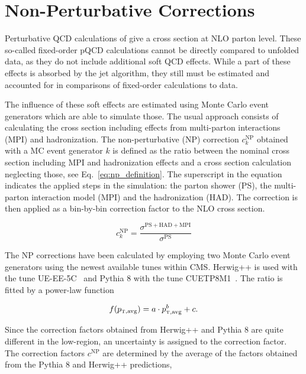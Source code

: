 
\section{Non-Perturbative Corrections}
\label{sec:np_factors}

Perturbative QCD calculations of \NLOJETPP give a cross section at NLO
parton level. These so-called fixed-order pQCD calculations cannot be directly
compared to unfolded data, as they do not include additional soft QCD
effects. While a part of these effects is absorbed by the jet algorithm,
they still must be estimated and accounted for in comparisons of fixed-order
calculations to data.

The influence of these soft effects are estimated using Monte Carlo event
generators which are able to simulate those. The usual approach consists of
calculating the cross section including effects from multi-parton interactions
(MPI) and hadronization. The non-perturbative (NP) correction $c_k^\mathrm{NP}$
obtained with a MC event generator $k$ is defined as the ratio between the
nominal cross section including MPI and hadronization effects and a cross section calculation
neglecting those, see Eq.~\ref{eq:np_definition}. The superscript in the
equation indicates the applied steps in the simulation: the parton shower (PS),
the multi-parton interaction model (MPI) and the hadronization (HAD). The
correction is then applied as a bin-by-bin correction factor to the NLO cross
section.

\begin{equation*}
    c_{k}^{\mathrm{NP}} = \frac{\sigma^{\mathrm{PS+HAD+MPI}}}{\sigma^{\mathrm{PS}}}
    \label{eq:np_definition}
\end{equation*}

The NP corrections have been calculated by employing two Monte Carlo event
generators using the newest available tunes within CMS. Herwig++ is used with
the tune UE-EE-5C~\cite{Seymour:2013qka} and Pythia 8 with the tune
CUETP8M1~\cite{Khachatryan:2015pea}. The ratio is fitted by a power-law function

\begin{equation*}
  f(\ptavg) = a \cdot \ptavg^b + c.
  \label{fcn:np_fit}
\end{equation*}

Since the correction factors obtained from Herwig++ and Pythia 8 are quite
different in the low-\pt region, an uncertainty is assigned to the correction
factor. The correction factors $c^\mathrm{NP}$ are determined by the average of the factors
obtained from the Pythia 8 and Herwig++ predictions,

